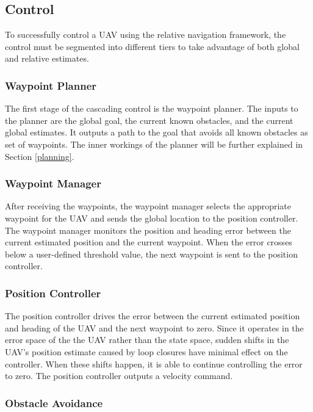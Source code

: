 \documentclass[letterpaper, 10 pt, conference]{ieeeconf}  %
\begin{document}
\subsection{Control}

To successfully control a UAV using the relative navigation framework, the control must be segmented into different tiers to take advantage of both global and relative estimates.

\subsubsection{Waypoint Planner}

The first stage of the cascading control is the waypoint planner. The inputs to the planner are the global goal, the current known obstacles, and the current global estimates. It outputs a path to the goal that avoids all known obstacles as set of waypoints. The inner workings of the planner will be further explained in Section \ref{planning}.

\subsubsection{Waypoint Manager}

After receiving the waypoints, the waypoint manager selects the appropriate waypoint for the UAV and sends the global location to the position controller. The waypoint manager monitors the position and heading error between the current estimated position and the current waypoint. When the error crosses below a user-defined threshold value, the next waypoint is sent to the position controller.

\subsubsection{Position Controller}

The position controller drives the error between the current estimated position and heading of the UAV and the next waypoint to zero. Since it operates in the error space of the the UAV rather than the state space, sudden shifts in the UAV's position estimate caused by loop closures have minimal effect on the controller. When these shifts happen, it is able to continue controlling the error to zero. The position controller outputs a velocity command.

\subsubsection{Obstacle Avoidance} \label{obs_avoid}
\end{document}
